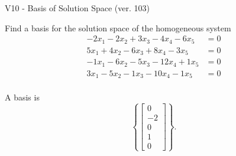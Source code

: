\begin{exercise}
  \begin{exerciseTitle}V10 - Basis of Solution Space (ver. 103)\end{exerciseTitle}
  \begin{exerciseStatement}
    Find a basis for the solution space of the homogeneous system 
\begin{align*}
 -2 x_ 1 -2 x_ 2 + 3 x_ 3 -4 x_ 4 -6 x_ 5 &= 0  \\ 
  5 x_ 1 + 4 x_ 2 -6 x_ 3 + 8 x_ 4 -3 x_ 5 &= 0  \\ 
  -1 x_ 1 -6 x_ 2 -5 x_ 3 -12 x_ 4 + 1 x_ 5 &= 0  \\ 
  3 x_ 1 -5 x_ 2 -1 x_ 3 -10 x_ 4 -1 x_ 5 &= 0  \\ 
 \end{align*}


 
  \end{exerciseStatement}

  \begin{exerciseAnswer}
   A basis is   
\[\left\{\left[\begin{array}{c}
0 \\
-2 \\
0 \\
1 \\
0
\end{array}\right]\right\}.\]

  


  \end{exerciseAnswer}
\end{exercise}